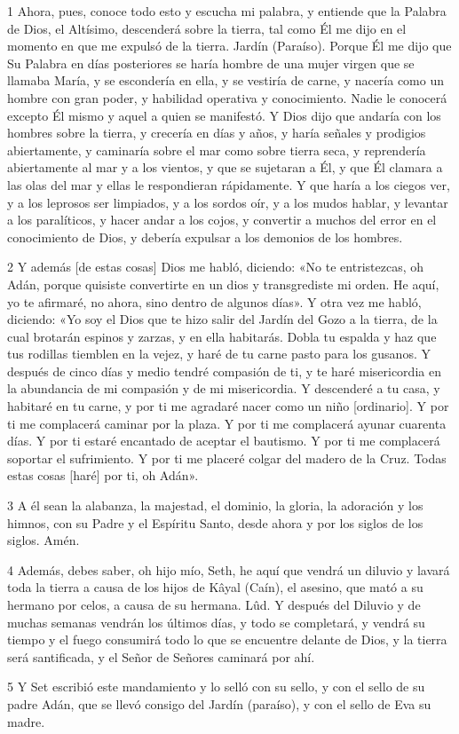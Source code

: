 \par 1 Ahora, pues, conoce todo esto y escucha mi palabra, y entiende que la Palabra de Dios, el Altísimo, descenderá sobre la tierra, tal como Él me dijo en el momento en que me expulsó de la tierra. Jardín (Paraíso). Porque Él me dijo que Su Palabra en días posteriores se haría hombre de una mujer virgen que se llamaba María, y se escondería en ella, y se vestiría de carne, y nacería como un hombre con gran poder, y habilidad operativa y conocimiento. Nadie le conocerá excepto Él mismo y aquel a quien se manifestó. Y Dios dijo que andaría con los hombres sobre la tierra, y crecería en días y años, y haría señales y prodigios abiertamente, y caminaría sobre el mar como sobre tierra seca, y reprendería abiertamente al mar y a los vientos, y que se sujetaran a Él, y que Él clamara a las olas del mar y ellas le respondieran rápidamente. Y que haría a los ciegos ver, y a los leprosos ser limpiados, y a los sordos oír, y a los mudos hablar, y levantar a los paralíticos, y hacer andar a los cojos, y convertir a muchos del error en el conocimiento de Dios, y debería expulsar a los demonios de los hombres.

\par 2 Y además [de estas cosas] Dios me habló, diciendo: «No te entristezcas, oh Adán, porque quisiste convertirte en un dios y transgrediste mi orden. He aquí, yo te afirmaré, no ahora, sino dentro de algunos días». Y otra vez me habló, diciendo: «Yo soy el Dios que te hizo salir del Jardín del Gozo a la tierra, de la cual brotarán espinos y zarzas, y en ella habitarás. Dobla tu espalda y haz que tus rodillas tiemblen en la vejez, y haré de tu carne pasto para los gusanos. Y después de cinco días y medio tendré compasión de ti, y te haré misericordia en la abundancia de mi compasión y de mi misericordia. Y descenderé a tu casa, y habitaré en tu carne, y por ti me agradaré nacer como un niño [ordinario]. Y por ti me complacerá caminar por la plaza. Y por ti me complacerá ayunar cuarenta días. Y por ti estaré encantado de aceptar el bautismo. Y por ti me complacerá soportar el sufrimiento. Y por ti me placeré colgar del madero de la Cruz. Todas estas cosas [haré] por ti, oh Adán».

\par 3 A él sean la alabanza, la majestad, el dominio, la gloria, la adoración y los himnos, con su Padre y el Espíritu Santo, desde ahora y por los siglos de los siglos. Amén.

\par 4 Además, debes saber, oh hijo mío, Seth, he aquí que vendrá un diluvio y lavará toda la tierra a causa de los hijos de Kâyal (Caín), el asesino, que mató a su hermano por celos, a causa de su hermana. Lûd. Y después del Diluvio y de muchas semanas vendrán los últimos días, y todo se completará, y vendrá su tiempo y el fuego consumirá todo lo que se encuentre delante de Dios, y la tierra será santificada, y el Señor de Señores caminará por ahí.

\par 5 Y Set escribió este mandamiento y lo selló con su sello, y con el sello de su padre Adán, que se llevó consigo del Jardín (paraíso), y con el sello de Eva su madre.

